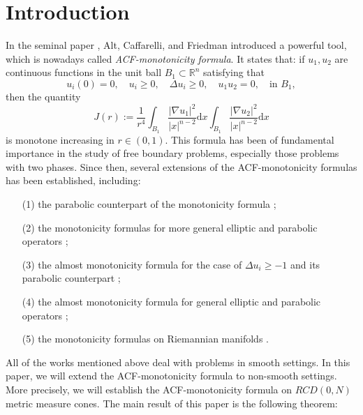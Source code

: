 \documentclass{article}
\theoremstyle{remark}
\numberwithin{equation}{section}
\theoremstyle{definition}
\begin{document}
\section{Introduction}
    In the seminal paper \cite{Alt-Caffarelli-Friedman_1984}, Alt, Caffarelli, and Friedman introduced a powerful tool, which is nowadays called \emph{ACF-monotonicity formula}. It states that: if $u_{1},u_{2}$ are continuous functions in the unit ball $B_{1} \subset \mathbb{R}^{n}$ satisfying that
    \begin{equation}
    	u_{i}(0)=0,\quad u_{i} \ge 0,\quad \Delta u_{i} \ge 0,\quad u_{1}u_{2}=0,\quad \text{in } B_{1},
    \end{equation}
    then the quantity
    \begin{equation}
    	J(r):=\frac{1}{r^{4}} \int_{B_{1}} \frac{\lvert \nabla u_{1} \rvert^{2}}{\lvert x \rvert^{n-2}} \mathrm{d}x \int_{B_{1}} \frac{\lvert \nabla u_{2} \rvert^{2}}{\lvert x \rvert^{n-2}} \mathrm{d}x
    \end{equation}
    is monotone increasing in $r \in (0,1)$. This formula has been of fundamental importance in the study of free boundary problems, especially those problems with two phases. Since then, several extensions of the ACF-monotonicity formulas has been established, including:
    \begin{itemize}
    	\item[(1)] the parabolic counterpart of the monotonicity formula \cite{Caffarelli_1993}; 
    	\item[(2)] the monotonicity formulas for more general elliptic and parabolic operators \cite{Caffarelli_1988,Caffarelli-Kenig_1998}; 
    	\item[(3)] the almost monotonicity formula for the case of $\Delta u_{i} \ge -1$ \cite{Caffarelli-Jerison-Kenig_2002} and its parabolic counterpart \cite{Edquist-Petrosyan_2008};
    	\item[(4)] the almost monotonicity formula for general elliptic and parabolic operators \cite{Matevosyan-Petrosyan_2011};
    	\item[(5)] the monotonicity formulas on Riemannian manifolds \cite{Teixeira-Zhang_2011_1,Teixeira-Zhang_2011_2}.
    \end{itemize}
    All of the works mentioned above deal with problems in smooth settings. In this paper, we will extend the ACF-monotonicity formula to non-smooth settings. More precisely, we will establish the ACF-monotonicity formula on $RCD(0,N)$ metric measure cones. The main result of this paper is the following theorem:
\end{document}
